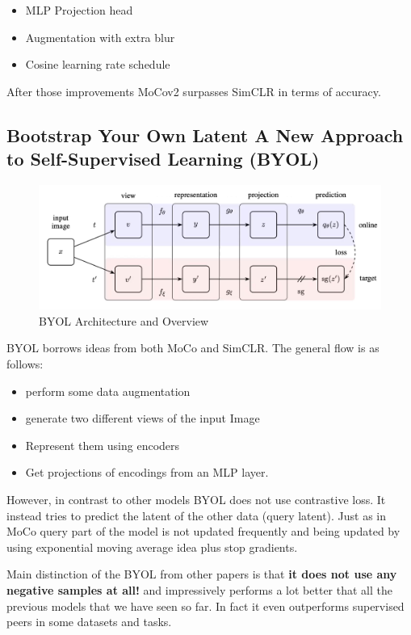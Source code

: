 \documentclass{article}
\begin{document}
\begin{itemize}
   \item MLP Projection head
   \item Augmentation with extra blur
   \item Cosine learning rate schedule
\end{itemize}
 
After those improvements MoCov2 surpasses SimCLR in terms of accuracy.
 
 
\subsection{Bootstrap Your Own Latent A New Approach
to Self-Supervised Learning (BYOL) \cite{grill2020bootstrap}}
 
\begin{figure}[H]
   \centering
   \includegraphics[width=0.8\linewidth]{figures/byol.png}
   \caption{BYOL Architecture and Overview}
   \label{fig:byol}
\end{figure}
 
BYOL borrows ideas from both MoCo and SimCLR.
The general flow is as follows:
\begin{itemize}
   \item perform some data augmentation
   \item generate two different views of the input Image
   \item Represent them using encoders
   \item Get projections of encodings from an MLP layer.
\end{itemize}
 
However, in contrast to other models BYOL does not use contrastive loss.
It instead tries to predict the latent of the other data (query latent).
Just as in MoCo query part of the model is not updated frequently and being updated
by using exponential moving average idea plus stop gradients.
 
Main distinction of the BYOL from other papers is that \textbf{it does not
use any negative samples at all!} and impressively performs a lot better
that all the previous models that we have seen so far. In fact it even outperforms
supervised peers in some datasets and tasks.
 
\end{document}
